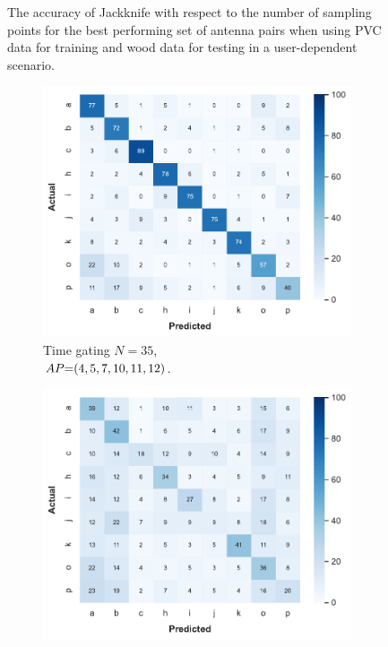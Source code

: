 \begin{figure}[ht]
  \vspace{-6pt}
  \caption{The accuracy of Jackknife with respect to the number of sampling points for the best performing set of antenna pairs when using PVC data for training and wood data for testing in a user-dependent scenario.}
  \label{fig:radar-experiments:through-materials:pvc-wood-samples}
\end{figure}

\begin{figure}[ht]
  \begin{subfigure}{.49\textwidth}
    \centering
    \includegraphics[width=.99\linewidth]{Figures/RadarExperiments/Datasets/ThroughMaterials/PVC+Wood/confusion-timegating-ud.pdf}
    \vspace{-15pt}
    \captionsetup{width=.99\linewidth}
    \caption{Time gating $N{=}35$, \\ $\splitatcommas{AP{=}(4, 5, 7, 10, 11, 12)}$.}
    \label{fig:radar-experiments:through-materials:pvc-wood-confusion:timegating-ud}
  \end{subfigure}
  \begin{subfigure}{.49\textwidth}
    \centering
    \includegraphics[width=.99\linewidth]{Figures/RadarExperiments/Datasets/ThroughMaterials/PVC+Wood/confusion-filtering-ud.pdf}

\end{subfigure}
\end{figure}
